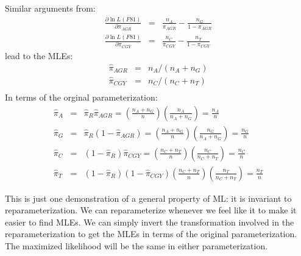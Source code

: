 \documentclass[11pt]{article}
\begin{document}
Similar arguments from:
\begin{eqnarray*}
  \frac{\partial\ln L(F81)}{\partial \pi_{AGR}} &=& \frac{n_A}{\pi_{AGR}} - \frac{n_G}{1 - \pi_{AGR}}  \\
  \frac{\partial\ln L(F81)}{\partial \pi_{CGY}} &=& \frac{n_C}{\pi_{CGY}} - \frac{n_T}{1 - \pi_{CGY}}  
\end{eqnarray*}
lead to the MLEs:
\begin{eqnarray*}
   \hat{\pi}_{AGR} & = & n_A/(n_A + n_G)\\ 
   \hat{\pi}_{CGY} & = & n_C/(n_C + n_T)\\ 
\end{eqnarray*}
In terms of the orginal parameterization:
\begin{eqnarray*}
\hat{\pi}_A & = & \hat{\pi}_R {\hat{\pi}}_{AGR} = \left(\frac{n_A+n_G}{n}\right)\left(\frac{n_A}{n_A+n_G} \right) = \frac{n_A}{n}\\
\hat{\pi}_G & = & \hat{\pi}_R (1 - {\hat{\pi}}_{AGR}) = \left(\frac{n_A+n_G}{n}\right)\left(\frac{n_G}{n_A+n_G} \right) = \frac{n_G}{n}\\
\hat{\pi}_C & = & (1-\hat{\pi}_R) \hat{\pi}_{CGY} = \left(\frac{n_C+n_T}{n}\right)\left(\frac{n_C}{n_C+n_T} \right) = \frac{n_C}{n}\\
\hat{\pi}_T & = & (1-\hat{\pi}_R) (1 - \hat{\pi}_{CGY})\left(\frac{n_C+n_T}{n}\right)\left(\frac{n_T}{n_C+n_T} \right) = \frac{n_T}{n}
\end{eqnarray*}

This is just one demonstration of a general property of ML: it is 
invariant to reparameterization.
We can reparameterize whenever we feel like it to make it easier to find MLEs. 
We can simply invert the transformation involved in the reparameterization to get the 
MLEs in terms of the original parameterization.
The maximized likelihood will be the same in either parameterization.
\end{document}
